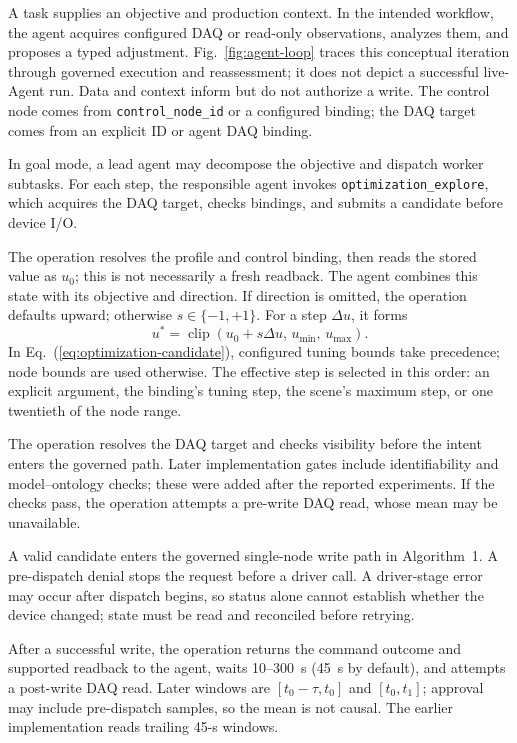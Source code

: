 \documentclass[journal]{IEEEtran}
\begin{document}
A task supplies an objective and production context. In the intended workflow, the agent acquires configured DAQ or read-only observations, analyzes them, and proposes a typed adjustment. Fig.~\ref{fig:agent-loop} traces this conceptual iteration through governed execution and reassessment; it does not depict a successful live-Agent run. Data and context inform but do not authorize a write. The control node comes from \texttt{control\_node\_id} or a configured binding; the DAQ target comes from an explicit ID or agent DAQ binding.

In goal mode, a lead agent may decompose the objective and dispatch worker subtasks. For each step, the responsible agent invokes \texttt{optimization\_explore}, which acquires the DAQ target, checks bindings, and submits a candidate before device I/O.

The operation resolves the profile and control binding, then reads the stored value as $u_0$; this is not necessarily a fresh readback. The agent combines this state with its objective and direction. If direction is omitted, the operation defaults upward; otherwise $s\in\{-1,+1\}$. For a step $\Delta u$, it forms
\begin{equation}
 u^{*}=\operatorname{clip}\!\left(u_0+s\Delta u,\,u_{\min},\,u_{\max}\right).
 \label{eq:optimization-candidate}
\end{equation}
In Eq.~(\ref{eq:optimization-candidate}), configured tuning bounds take precedence; node bounds are used otherwise. The effective step is selected in this order: an explicit argument, the binding's tuning step, the scene's maximum step, or one twentieth of the node range.

The operation resolves the DAQ target and checks visibility before the intent enters the governed path. Later implementation gates include identifiability and model--ontology checks; these were added after the reported experiments. If the checks pass, the operation attempts a pre-write DAQ read, whose mean may be unavailable.

A valid candidate enters the governed single-node write path in Algorithm~1. A pre-dispatch denial stops the request before a driver call. A driver-stage error may occur after dispatch begins, so status alone cannot establish whether the device changed; state must be read and reconciled before retrying.

After a successful write, the operation returns the command outcome and supported readback to the agent, waits 10--300~s (45~s by default), and attempts a post-write DAQ read. Later windows are $[t_0-\tau,t_0]$ and $[t_0,t_1]$; approval may include pre-dispatch samples, so the mean is not causal. The earlier implementation reads trailing 45-s windows.
\end{document}
